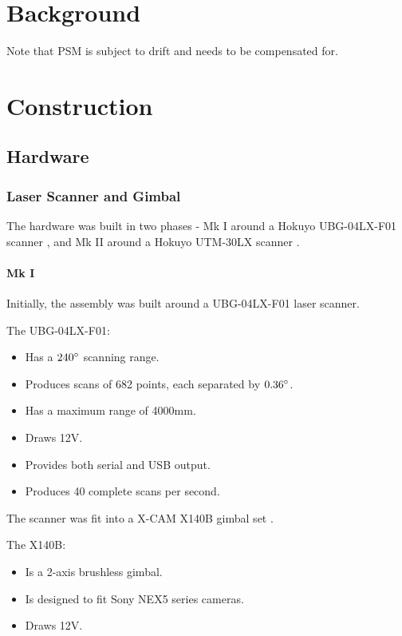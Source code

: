 \documentclass[12pt,oneside,a4paper]{book}
\begin{document}
\chapter{Background}
\label{cha:background}

Note  that PSM is subject to
drift and needs to be compensated for.

\chapter{Construction}
\label{cha:construction}

\section{Hardware}
\label{sec:hardware}

\subsection{Laser Scanner and Gimbal}
\label{sec:laser-scanner-gimbal}

The hardware was built in two phases - Mk I around a Hokuyo
UBG-04LX-F01 scanner \cite{scanner1}, and Mk II around a Hokuyo UTM-30LX scanner \cite{scanner2}. 

\subsubsection{Mk I}
\label{sec:mk-i}

Initially, the assembly was built around a UBG-04LX-F01 laser
scanner.

The UBG-04LX-F01:
\begin{itemize}
\item Has a $240\degree$ scanning range.
\item Produces scans of 682 points, each separated by $0.36\degree$.
\item Has a maximum range of 4000mm.
\item Draws 12V.
\item Provides both serial and USB output.
\item Produces 40 complete scans per second.
\end{itemize}

The scanner was fit into a X-CAM X140B gimbal set \cite{gimbal}. 

The X140B:
\begin{itemize}
\item Is a 2-axis brushless gimbal.
\item Is designed to fit Sony NEX5 series cameras.
\item Draws 12V.
\end{itemize}
\end{document}
